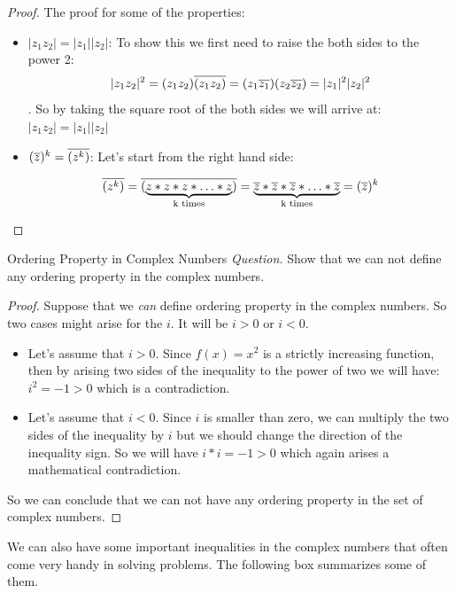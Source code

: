 \begin{proof}
	The proof for some of the properties: \\
	\begin{itemize}
	\item $|z_1 z_2|= |z_1||z_2|$: To show this we first need to raise the both sides to the power 2:
	\[ |z_1 z_2|^2 = (z_1 z_2)\overline{(z_1 z_2)} = (z_1 \overline{z_1})(z_2 \overline{z_2}) = |z_1|^2|z_2|^2 \]. So by taking the square root of the both sides we will arrive at: $|z_1 z_2| = |z_1||z_2|$
	
	\item $(\overline{z})^k = \overline{(z^k)}$: Let's start from the right hand side:
	
	\[ \overline{(z^k)} = \overline{(\underbrace{z*z*z*\ldots*z}_\text{k times})} = \underbrace{\overline{z}*\overline{z}*\overline{z}*\ldots*\overline{z}}_\text{k times} = (\overline{z})^k\]
	\end{itemize}
\end{proof}


\begin{example}{Ordering Property in Complex Numbers}
	\emph{Question.} Show that we can not define any ordering property in the complex numbers.
	\begin{proof}
		Suppose that we \emph{can} define ordering property in the complex numbers. So two cases might arise for the $i$. It will be $i>0$ or $i<0$. 
		
		\begin{itemize}
		\item Let's assume that $i>0$. Since $f(x) = x^2$ is a strictly increasing function, then by arising two sides of the inequality to the power of two we will have: $i^2 = -1 > 0$ which is a contradiction.
		
		\item Let's assume that $i<0$. Since $i$ is smaller than zero, we can multiply the two sides of the inequality by $i$ but we should change the direction of the inequality sign. So we will have $i*i = -1 > 0$ which again arises a mathematical contradiction.
		\end{itemize}
		
		So we can conclude that we can not have any ordering property in the set of complex numbers.
	\end{proof}
\end{example}



We can also have some important inequalities in the complex numbers that often come very handy in solving problems. The following box summarizes some of them.


